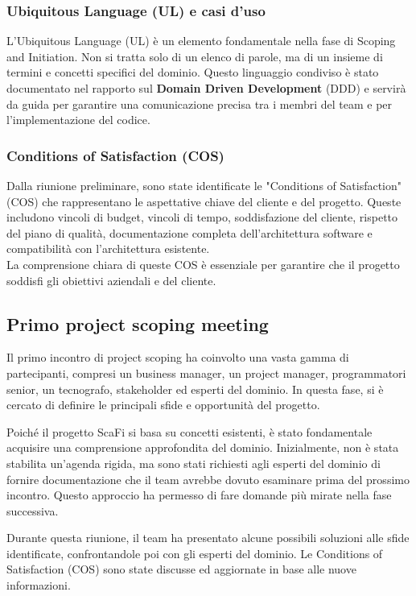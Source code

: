\subsubsection{Ubiquitous Language (UL) e casi d'uso}
L'Ubiquitous Language (UL) è un elemento fondamentale nella fase di Scoping and Initiation. Non si
tratta solo di un elenco di parole, ma di un insieme di termini e concetti specifici del dominio.
Questo linguaggio condiviso è stato documentato nel rapporto sul \textbf{Domain Driven Development}
(DDD) e servirà da guida per garantire una comunicazione precisa tra i membri del team e per
l'implementazione del codice.\\

\subsubsection{Conditions of Satisfaction (COS)}
Dalla riunione preliminare, sono state identificate le "Conditions of Satisfaction" (COS) che rappresentano
le aspettative chiave del cliente e del progetto. Queste includono vincoli di budget, vincoli di tempo,
soddisfazione del cliente, rispetto del piano di qualità, documentazione completa dell'architettura
software e compatibilità con l'architettura esistente.\\

La comprensione chiara di queste COS è essenziale per garantire che il progetto soddisfi gli obiettivi
aziendali e del cliente.\\

\subsection{Primo project scoping meeting}
Il primo incontro di project scoping ha coinvolto una vasta gamma di partecipanti, compresi un business manager, un project manager, programmatori senior, un tecnografo, stakeholder ed esperti del dominio. In questa fase, si è cercato di definire le principali sfide e opportunità del progetto.

Poiché il progetto ScaFi si basa su concetti esistenti, è stato fondamentale acquisire una comprensione approfondita del dominio. Inizialmente, non è stata stabilita un'agenda rigida, ma sono stati richiesti agli esperti del dominio di fornire documentazione che il team avrebbe dovuto esaminare prima del prossimo incontro. Questo approccio ha permesso di fare domande più mirate nella fase successiva.

Durante questa riunione, il team ha presentato alcune possibili soluzioni alle sfide identificate, confrontandole poi con gli esperti del dominio. Le Conditions of Satisfaction (COS) sono state discusse ed aggiornate in base alle nuove informazioni.

